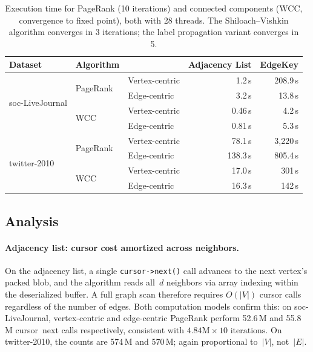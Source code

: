 \begin{table}[ht]
\centering
\begin{tabular}{lllrr}
\toprule
\textbf{Dataset} & \textbf{Algorithm} & & \textbf{Adjacency List} & \textbf{EdgeKey} \\
\midrule
\multirow{4}{*}{soc-LiveJournal}
  & \multirow{2}{*}{PageRank}
    & Vertex-centric &     1.2\,s &    208.9\,s \\
  & & Edge-centric   &     3.2\,s &     13.8\,s \\
  \cmidrule(l){2-5}
  & \multirow{2}{*}{WCC}
    & Vertex-centric &     0.46\,s &     4.2\,s \\
  & & Edge-centric   &     0.81\,s &     5.3\,s \\
\midrule
\multirow{4}{*}{twitter-2010}
  & \multirow{2}{*}{PageRank}
    & Vertex-centric &    78.1\,s &  3{,}220\,s \\
  & & Edge-centric   &   138.3\,s &    805.4\,s \\
  \cmidrule(l){2-5}
  & \multirow{2}{*}{WCC}
    & Vertex-centric &    17.0\,s &    301\,s \\
  & & Edge-centric   &    16.3\,s &    142\,s \\
\bottomrule
\end{tabular}
\caption{Execution time for PageRank (10 iterations) and connected components (WCC, convergence to fixed point), both with 28 threads.
         The Shiloach--Vishkin algorithm converges in 3 iterations; the label propagation variant converges in 5.}
\label{tab:ec_vc_time}
\label{tab:cc_time}
\end{table}


\subsection{Analysis}

\paragraph{Adjacency list: cursor cost amortized across neighbors.}
On the adjacency list, a single \texttt{cursor->next()} call advances to the next vertex's packed blob, and the algorithm reads all~$d$ neighbors via array indexing within the deserialized buffer.
A full graph scan therefore requires $O(|V|)$ cursor calls regardless of the number of edges.
Both computation models confirm this: on soc-LiveJournal, vertex-centric and edge-centric PageRank perform 52.6\,M and 55.8\,M cursor~next calls respectively, consistent with $4.84\text{M} \times 10\text{ iterations}$.
On twitter-2010, the counts are 574\,M and 570\,M; again proportional to~$|V|$, not~$|E|$.

